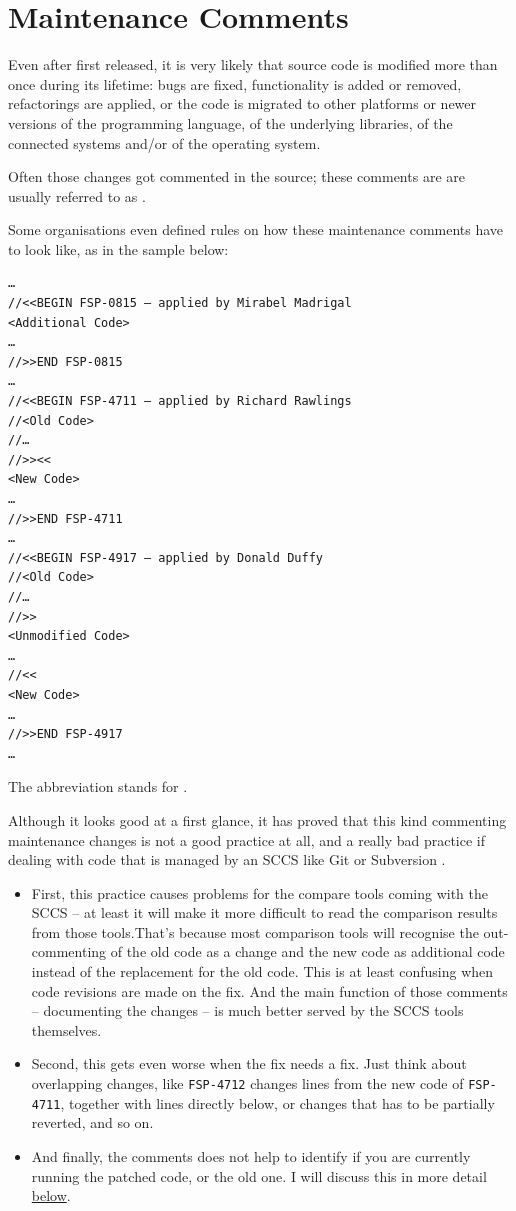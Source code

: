 \chapter{Maintenance Comments}\label{sec:MaintenanceComments}
Even after first released, it is very likely that source code is modified more than once during its lifetime: bugs are fixed, functionality is added or removed, refactorings are applied, or the code is migrated to other platforms or newer versions of the programming language, of the underlying libraries, of the connected systems and/or of the operating system.

Often those changes got commented in the source; these comments are  are usually referred to as .

Some organisations even defined rules on how these maintenance comments have to look like, as in the sample below:
\begin{lstlisting}
…
//<<BEGIN FSP-0815 – applied by Mirabel Madrigal
<Additional Code>
…
//>>END FSP-0815
…
//<<BEGIN FSP-4711 – applied by Richard Rawlings
//<Old Code>
//…
//>><<
<New Code>
…
//>>END FSP-4711
…
//<<BEGIN FSP-4917 – applied by Donald Duffy
//<Old Code>
//…
//>>
<Unmodified Code>
…
//<<
<New Code>
…
//>>END FSP-4917
…
\end{lstlisting}

The abbreviation  stands for .

Although it looks good at a first glance, it has proved that this kind commenting maintenance changes is not a good practice at all, and a really bad practice if dealing with code that is managed by an SCCS like Git \autocite{Git} or Subversion \autocite{APACHE_SUBVERSION}.

\begin{itemize}
	\item{First, this practice causes problems for the compare tools coming with the SCCS – at least it will make it more difficult to read the comparison results from those tools.That's because most comparison tools will recognise the out-commenting of the old code as a change and the new code as additional code instead of the replacement for the old code. This is at least confusing when code revisions are made on the fix. And the main function of those comments – documenting the changes – is much better served by the SCCS tools themselves.}
	
	\item{Second, this gets even worse when the fix needs a fix. Just think about overlapping changes, like \texttt{FSP-4712} changes lines from the new code of \texttt{FSP-4711}, together with lines directly below, or changes that has to be partially reverted, and so on.}
	
	\item{And finally, the comments does not help to identify if you are currently running the patched code, or the old one. I will discuss this in more detail \hyperref[loc:CommentVsAnnotations]{below}.}
\end{itemize}

